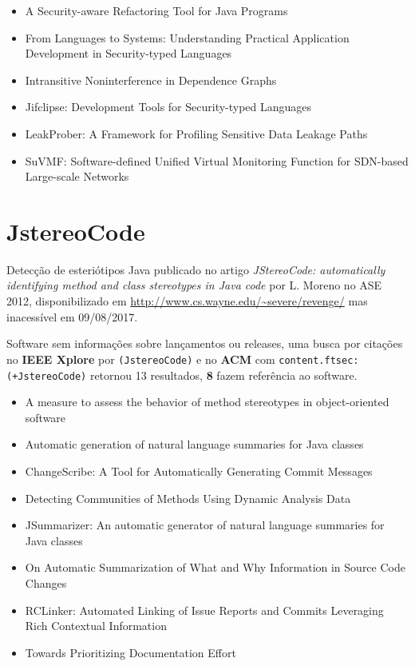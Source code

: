 \begin{itemize}
\item A Security-aware Refactoring Tool for Java Programs
\item From Languages to Systems: Understanding Practical Application Development in Security-typed Languages
\item Intransitive Noninterference in Dependence Graphs
\item Jifclipse: Development Tools for Security-typed Languages
\item LeakProber: A Framework for Profiling Sensitive Data Leakage Paths
\item SuVMF: Software-defined Unified Virtual Monitoring Function for SDN-based Large-scale Networks
\end{itemize}


\section{JstereoCode}

Detecção de esteriótipos Java
publicado no artigo {\it JStereoCode: automatically identifying method and class stereotypes in Java code}
por L. Moreno
no ASE 2012,
disponibilizado em \url{http://www.cs.wayne.edu/~severe/revenge/}
mas inacessível em 09/08/2017.

Software sem informações sobre lançamentos ou releases,
uma busca por citações no {\bf IEEE Xplore} por
\texttt{(JstereoCode)}
e no {\bf ACM} com
\texttt{content.ftsec:(+JstereoCode)}
retornou
13 resultados,
{\bf 8} fazem referência ao software.

\begin{itemize}
\item A measure to assess the behavior of method stereotypes in object-oriented software
\item Automatic generation of natural language summaries for Java classes
\item ChangeScribe: A Tool for Automatically Generating Commit Messages
\item Detecting Communities of Methods Using Dynamic Analysis Data
\item JSummarizer: An automatic generator of natural language summaries for Java classes
\item On Automatic Summarization of What and Why Information in Source Code Changes
\item RCLinker: Automated Linking of Issue Reports and Commits Leveraging Rich Contextual Information
\item Towards Prioritizing Documentation Effort
\end{itemize}


